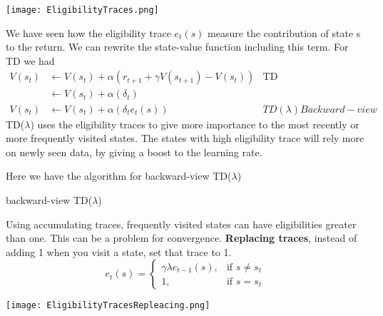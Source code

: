 \documentclass[main.tex]{subfiles}
\begin{document}
\begin{center}
    \texttt{[image: EligibilityTraces.png]}
\end{center}
We have seen how the eligibility trace $e_t(s)$ measure the contribution of state s to the return. We can rewrite the state-value function including this term. For TD we had 
\begin{align*}
    V(s_t) &\leftarrow V(s_t) + \alpha(r_{t+1} + \gamma V(s_{t+1})-V(s_t)) & \text{TD}\\
    &\leftarrow V(s_t) + \alpha(\delta_t) \\
    V(s_t) &\leftarrow V(s_t) + \alpha(\delta_t e_t(s)) &TD(\lambda)Backward-view
\end{align*}
TD($\lambda$) uses the eligibility traces to give more importance to the most recently or more frequently visited states. The states with high eligibility trace will rely more on newly seen data, by giving a boost to the learning rate.
\par
\noindent
Here we have the algorithm for backward-view TD($\lambda$)
\newline
\begin{algorithm}[H]
\SetAlgoLined
{}


\caption{backward-view TD($\lambda$)}
\end{algorithm}
\par
\noindent
Using accumulating traces, frequently visited states can have eligibilities greater than one. This can be a problem for convergence. \textbf{Replacing traces}, instead of adding 1 when you visit a state, set that trace to 1.
\begin{equation}
    e_t(s) = 
    \begin{cases}
        \gamma \lambda e_{t-1}(s),& \text{if }s \neq s_t\\
        1,& \text{if }s=s_t
    \end{cases}
\end{equation}
\begin{center}
    \texttt{[image: EligibilityTracesRepleacing.png]}
\end{center}
\newpage
\end{document}
